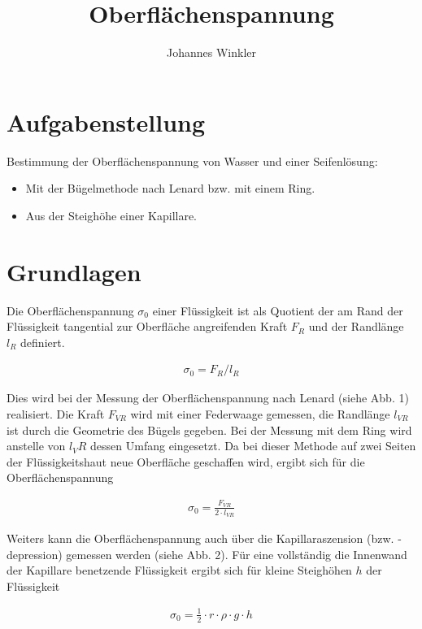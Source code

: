 \documentclass{article}
\title{Oberflächenspannung}
\author{Johannes Winkler}
\date{}
\begin{document}
 
 
 
\pagestyle{fancy}


\tableofcontents

\newpage


\section{Aufgabenstellung}

Bestimmung der Oberflächenspannung von Wasser und einer Seifenlösung:
\begin{itemize}
\item Mit der Bügelmethode nach Lenard bzw. mit einem Ring.
\item Aus der Steighöhe einer Kapillare.
\end{itemize}



\section{Grundlagen}

Die Oberflächenspannung $\sigma_0$ einer Flüssigkeit ist als Quotient der am Rand der Flüssigkeit
tangential zur Oberfläche angreifenden Kraft $F_R$ und der Randlänge $l_R$ definiert.

\begin{align}
\sigma_0 = F_R/l_R
\end{align}

Dies wird bei der Messung der Oberflächenspannung nach Lenard (siehe Abb. 1) realisiert. Die
Kraft $F_{VR}$ wird mit einer Federwaage gemessen, die Randlänge $l_{VR}$ ist durch die Geometrie des
Bügels gegeben. Bei der Messung mit dem Ring wird anstelle von $l_VR$ dessen Umfang eingesetzt.
Da bei dieser Methode auf zwei Seiten der Flüssigkeitshaut neue Oberfläche geschaffen wird,
ergibt sich für die Oberflächenspannung

\begin{align}
\sigma_0 = \frac{F_{VR}}{2\cdot l_{VR}}
\end{align}

Weiters kann die Oberflächenspannung auch über die Kapillaraszension (bzw. -depression) gemessen werden (siehe Abb. 2). Für eine vollständig die Innenwand der Kapillare benetzende Flüssigkeit ergibt sich für kleine Steighöhen $h$ der Flüssigkeit

\begin{align}
\sigma_0 = \frac12 \cdot r \cdot \rho \cdot g \cdot h
\end{align}
\end{document}
